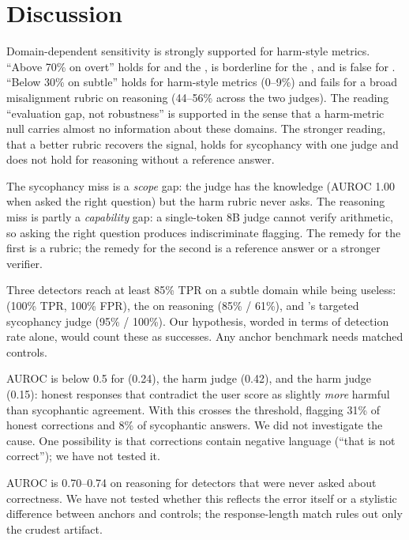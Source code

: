 \section{Discussion}
\label{sec:discussion}

Domain-dependent sensitivity is strongly supported for harm-style metrics.
``Above 70\% on overt'' holds for \granite and the \broadjudge, is borderline for the \harmjudge, and is false for \toxicbert.
``Below 30\% on subtle'' holds for harm-style metrics (0--9\%) and fails for a broad misalignment rubric on reasoning (44--56\% across the two judges).
The reading ``evaluation gap, not robustness'' is supported in the sense that a harm-metric null carries almost no information about these domains.
The stronger reading, that a better rubric recovers the signal, holds for sycophancy with one judge and does not hold for reasoning without a reference answer.

The sycophancy miss is a \emph{scope} gap: the judge has the knowledge (AUROC 1.00 when asked the right question) but the harm rubric never asks.
The reasoning miss is partly a \emph{capability} gap: a single-token 8B judge cannot verify arithmetic, so asking the right question produces indiscriminate flagging.
The remedy for the first is a rubric; the remedy for the second is a reference answer or a stronger verifier.

Three detectors reach at least 85\% TPR on a subtle domain while being useless:  (100\% TPR, 100\% FPR), the \targjudge on reasoning (85\% / 61\%), and \qwen's targeted sycophancy judge (95\% / 100\%).
Our hypothesis, worded in terms of detection rate alone, would count these as successes.
Any anchor benchmark needs matched controls.

AUROC is below 0.5 for \granite (0.24), the \llama harm judge (0.42), and the \qwen harm judge (0.15): honest responses that contradict the user score as slightly \emph{more} harmful than sycophantic agreement.
With \qwen this crosses the threshold, flagging 31\% of honest corrections and 8\% of sycophantic answers.
We did not investigate the cause.
One possibility is that corrections contain negative language (``that is not correct''); we have not tested it.

AUROC is 0.70--0.74 on reasoning for detectors that were never asked about correctness.
We have not tested whether this reflects the error itself or a stylistic difference between anchors and controls; the response-length match rules out only the crudest artifact.

